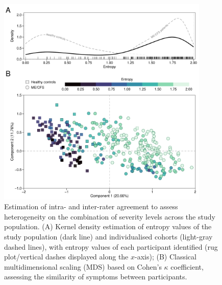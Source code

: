 \begin{figure}[htbp]
    \centering
    \includegraphics[width=0.9\textwidth]{chapter/2024-sym-domains/figures/fig1-id-entropy-and-mds.pdf}
    \caption[Estimation of intra- and inter-rater agreement to assess heterogeneity on the combination of severity levels across the study population]{Estimation of intra- and inter-rater agreement to assess heterogeneity on the combination of severity levels across the study population. (A) Kernel density estimation of entropy values of the study population (dark line) and individualised cohorts (light-gray dashed lines), with entropy values of each participant identified (rug plot/vertical dashes displayed along the $x$-axis); (B) Classical multidimensional scaling (MDS) based on Cohen's $\kappa$ coefficient, assessing the similarity of symptoms between participants.}
    \label{fig:fig1-id-entropy-and-mds}
\end{figure}


